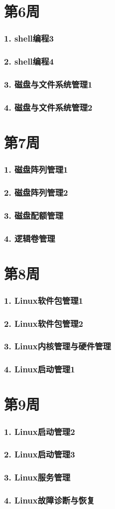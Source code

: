 \documentclass[bigger]{beamer}
\begin{document}
\section{第6周}
\label{sec-6}
\begin{frame}
\frametitle{1. shell编程3}
\label{sec-6-1}
\end{frame}
\begin{frame}
\frametitle{2. shell编程4}
\label{sec-6-2}
\end{frame}
\begin{frame}
\frametitle{3. 磁盘与文件系统管理1}
\label{sec-6-3}
\end{frame}
\begin{frame}
\frametitle{4. 磁盘与文件系统管理2}
\label{sec-6-4}
\end{frame}
\section{第7周}
\label{sec-7}
\begin{frame}
\frametitle{1. 磁盘阵列管理1}
\label{sec-7-1}
\end{frame}
\begin{frame}
\frametitle{2. 磁盘阵列管理2}
\label{sec-7-2}
\end{frame}
\begin{frame}
\frametitle{3. 磁盘配额管理}
\label{sec-7-3}
\end{frame}
\begin{frame}
\frametitle{4. 逻辑卷管理}
\label{sec-7-4}
\end{frame}
\section{第8周}
\label{sec-8}
\begin{frame}
\frametitle{1. Linux软件包管理1}
\label{sec-8-1}
\end{frame}
\begin{frame}
\frametitle{2. Linux软件包管理2}
\label{sec-8-2}
\end{frame}
\begin{frame}
\frametitle{3. Linux内核管理与硬件管理}
\label{sec-8-3}
\end{frame}
\begin{frame}
\frametitle{4. Linux启动管理1}
\label{sec-8-4}
\end{frame}
\section{第9周}
\label{sec-9}
\begin{frame}
\frametitle{1. Linux启动管理2}
\label{sec-9-1}
\end{frame}
\begin{frame}
\frametitle{2. Linux启动管理3}
\label{sec-9-2}
\end{frame}
\begin{frame}
\frametitle{3. Linux服务管理}
\label{sec-9-3}
\end{frame}
\begin{frame}
\frametitle{4. Linux故障诊断与恢复}
\label{sec-9-4}
\end{frame}
\end{document}
